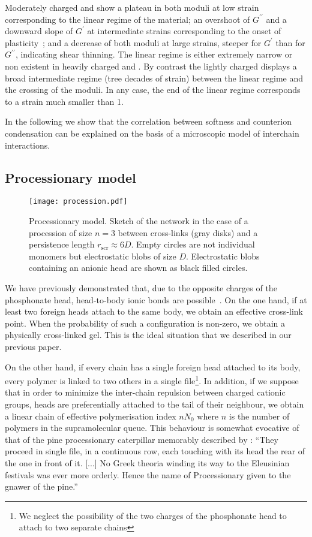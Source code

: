 \documentclass[twoside,twocolumn,9pt]{article}
\begin{document}
Moderately charged  and  show a plateau in both moduli at low strain corresponding to the linear regime of the material; an overshoot of $G^{\prime\prime}$ and a downward slope of $G^\prime$ at intermediate strains corresponding to the onset of plasticity~\cite{Hyun2011}; and a decrease of both moduli at large strains, steeper for $G^\prime$ than for $G^{\prime\prime}$, indicating shear thinning. The linear regime is either extremely narrow or non existent in heavily charged  and . By contrast the lightly charged  displays a broad intermediate regime (tree decades of strain) between the linear regime and the crossing of the moduli. In any case, the end of the linear regime corresponds to a strain much smaller than 1.

In the following we show that the correlation between softness and counterion condensation can be explained on the basis of a microscopic model of interchain interactions.

\subsection{Processionary model}

\begin{figure}
\texttt{[image: procession.pdf]}
\caption{Processionary model. Sketch of the network in the case of a procession of size $n=3$ between cross-links (gray disks) and a persistence length $r_\mathrm{scr}\approx 6D$. Empty circles are not individual monomers but electrostatic blobs of size $D$. Electrostatic blobs containing an anionic head are shown as black filled circles.}
\label{fig:dissociation}
\end{figure}

We have previously demonstrated that, due to the opposite charges of the phosphonate head, head-to-body ionic bonds are possible~\cite{Srour2014}. On the one hand, if at least two foreign heads attach to the same body, we obtain an effective cross-link point. When the probability of such a configuration is non-zero, we obtain a physically cross-linked gel. This is the ideal situation that we described in our previous paper.

On the other hand, if every chain has a single foreign head attached to its body, every polymer is linked to two others in a single file\footnote[3]{We neglect the possibility of the two charges of the phosphonate head to attach to two separate chains}. In addition, if we suppose that in order to minimize the inter-chain repulsion between charged cationic groups, heads are preferentially attached to the tail of their neighbour, we obtain a linear chain of effective polymerisation index $n N_0$ where $n$ is the number of polymers in the supramolecular queue. This behaviour is somewhat evocative of that of the pine processionary caterpillar memorably described by \citet{Fabre1916}: 
``They proceed in single file, in a continuous row, each touching with its head the rear of the one in front of it. [...] No Greek theoria winding its way to the Eleusinian festivals was ever more orderly. Hence the name of Processionary given to the gnawer of the pine.''
\end{document}
